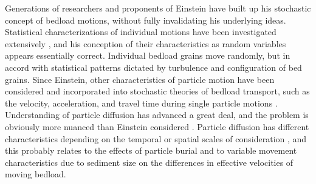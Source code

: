 \documentclass{article}
\begin{document}
Generations of researchers and proponents of Einstein have built up his stochastic concept of bedload motions, without fully invalidating his underlying ideas. 
Statistical characterizations of individual motions have been investigated extensively \citep{Hubbell1964, Yano1969, Nakagawa1976, Hassan1991, Habersack2001, Ancey2008, Roseberry2012, Heyman2013, Heyman2016}, and his conception of their characteristics as random variables appears essentially correct. 
Individual bedload grains move randomly, but in accord with statistical patterns dictated by turbulence and configuration of bed grains.  
Since Einstein, other characteristics of particle motion have been considered and incorporated into stochastic theories of bedload transport, such as the velocity, acceleration, and travel time during single particle motions \citep{Drake1988, Radice2006, Ancey2008, Lajeunesse2010, Furbish2012a, Roseberry2012, Furbish2015, Fathel2015, Heyman2016}. 
Understanding of particle diffusion has advanced a great deal, and the problem is obviously more nuanced than Einstein considered \citep{Einstein1937}.  
Particle diffusion has different characteristics depending on the temporal or spatial scales of consideration \citep{Nikora2002, Zhang2012, Martin2012}, and this probably relates to the effects of particle burial \citep{Sayre1971, Nakagawa1980, Voepel2013, Martin2014, Bradley2017} and to variable movement characteristics due to sediment size \citep{Fan2017} on the differences in effective velocities of moving bedload. 
\end{document}
